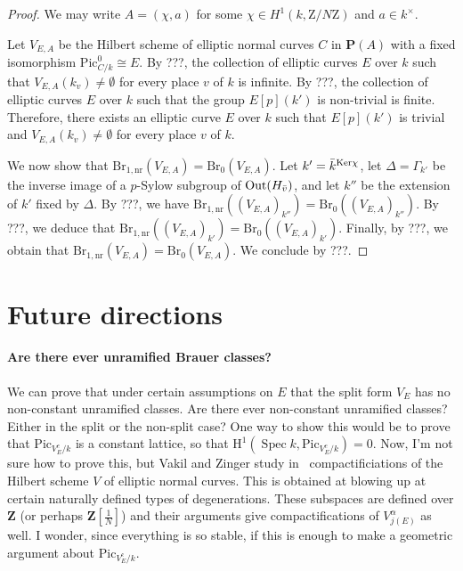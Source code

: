 \documentclass[10pt,letterpaper,twoside]{article}
\renewcommand{\H}{\mathrm{H}}
\newcommand{\Z}{\mathrm{Z}}
\renewcommand{\1}{\mathbf{1}}
\newcommand{\bP}{\mathbf{P}}
\newcommand{\bZ}{\mathbf{Z}}
\newcommand{\nr}{\mathrm{nr}}
\newcommand{\Pic}{\mathrm{Pic}}
\newcommand{\Br}{\mathrm{Br}}
\DeclareMathOperator{\Spec}{Spec}
\newcommand{\iso}{\cong}
\theoremstyle{plain}
\theoremstyle{plain}
\theoremstyle{definition}
\theoremstyle{named}
\theoremstyle{definition}
\begin{document}
\begin{proof}
    We may write $A=(\chi,a)$ for some $\chi\in H^1(k,\Z/N\Z)$ and $a\in k^\times$. 
    
    Let $V_{E,A}$ be the Hilbert scheme of elliptic normal curves $C$ in $\bP(A)$ with a fixed isomorphism $\Pic_{C/k}^0\iso E$. By ???, the collection of elliptic curves $E$ over $k$ such that $V_{E,A}(k_v)\neq \emptyset$ for every place $v$ of $k$ is infinite. By ???, the collection of elliptic curves $E$ over $k$ such that the group $E[p](k')$ is non-trivial is finite. Therefore, there exists an elliptic curve $E$ over $k$ such that $E[p](k')$ is trivial and $V_{E,A}(k_v)\neq \emptyset$ for every place $v$ of $k$.

    We now show that $\Br_{1,\nr}(V_{E,A})=\Br_0(V_{E,A})$. Let $k'=\Bar{k}^{\mathrm{Ker}\chi}$, let $\Delta= \Gamma_{k'}$ be the inverse image of a $p$-Sylow subgroup of $\mathrm{Out}(H_{\Bar{v}})$, and let $k''$ be the extension of $k'$ fixed by $\Delta$. By ???, we have $\Br_{1,\nr}((V_{E,A})_{k''})=\Br_0((V_{E,A})_{k''})$. By ???, we deduce that $\Br_{1,\nr}((V_{E,A})_{k'})=\Br_0((V_{E,A})_{k'})$. Finally, by ???, we obtain that $\Br_{1,\nr}(V_{E,A})=\Br_0(V_{E,A})$. We conclude by ???.
    \end{proof}


\section{Future directions}

\paragraph{Are there ever unramified Brauer classes?} We can prove that under certain assumptions on
$E$ that the split form $V_E$ has no non-constant unramified classes. Are there ever non-constant
unramified classes? Either in the split or the non-split case? One way to show this would be to
prove that $\Pic_{V^c_E/k}$ is a constant lattice, so that $\H^1(\Spec k,\Pic_{V^c_E/k})=0$. Now,
I'm not sure how to prove this, but Vakil and Zinger study
in~\cite{vakil-zinger,vakil-zinger-announce} compactificiations of the Hilbert scheme $V$ of elliptic normal
curves. This is obtained at blowing up at certain naturally defined types of degenerations. These
subspaces are defined over $\bZ$ (or perhaps $\bZ[\tfrac{1}{N}]$) and their arguments give
compactifications of $V_{j(E)}^\alpha$ as well. I wonder, since everything is so stable, if this is
enough to make a geometric argument about $\Pic_{V^c_E/k}$.
\end{document}
